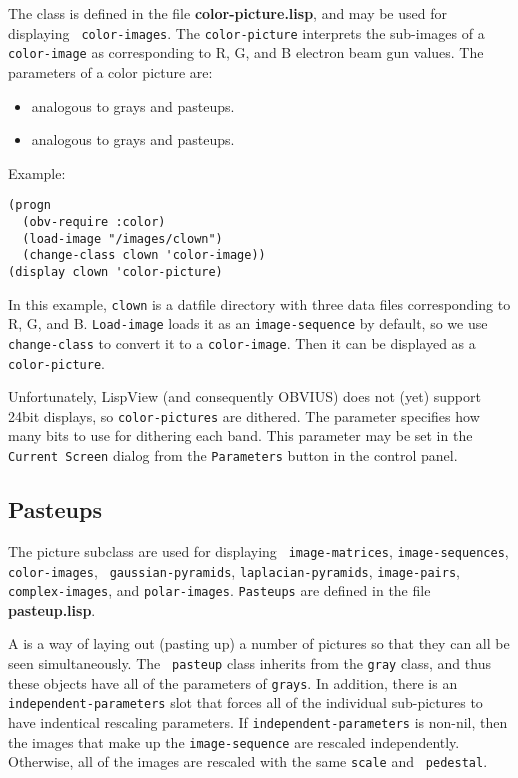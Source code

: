 The  class is defined in the file {\bf
color-picture.lisp}, and may be used for displaying {\tt
color-images}.  The {\tt color-picture} interprets the sub-images of a
{\tt color-image} as corresponding to R, G, and B electron beam gun
values.  The parameters of a color picture are:
\begin{itemize}
\item {} analogous to grays and pasteups.
\item {} analogous to grays and pasteups.
\end{itemize}
Example:
\begin{verbatim}
(progn
  (obv-require :color)
  (load-image "/images/clown")
  (change-class clown 'color-image))
(display clown 'color-picture)
\end{verbatim}
In this example, {\tt clown} is a datfile directory with three data
files corresponding to R, G, and B.  {\tt Load-image} loads it as an
{\tt image-sequence} by default, so we use {\tt change-class} to
convert it to a {\tt color-image}.  Then it can be displayed as a {\tt
color-picture}.

Unfortunately, LispView (and consequently OBVIUS) does not (yet)
support 24bit displays, so {\tt color-pictures} are dithered.  The
parameter  specifies how many bits to use for dithering
each band.  This parameter may be set in the {\tt Current Screen}
dialog from the {\tt Parameters} button in the control panel.  


\subsection{Pasteups}
\label{sec:pasteup}

The  picture subclass are used for displaying {\tt
image-matrices}, {\tt image-sequences}, {\tt color-images}, {\tt
gaussian-pyramids}, {\tt laplacian-pyramids}, {\tt image-pairs}, {\tt
complex-images}, and {\tt polar-images}.  {\tt Pasteups} are defined
in the file {\bf pasteup.lisp}.

A  is a way of laying out (pasting up) a number of
pictures so that they can all be seen simultaneously.  The {\tt
pasteup} class inherits from the {\tt gray} class, and thus these
objects have all of the parameters of {\tt grays}.  In addition, there
is an {\tt independent-parameters} slot that forces all of the
individual sub-pictures to have indentical rescaling parameters.  If
{\tt independent-parameters} is non-nil, then the images that make up
the {\tt image-sequence} are rescaled independently.  Otherwise, all
of the images are rescaled with the same {\tt scale} and {\tt
pedestal}.

